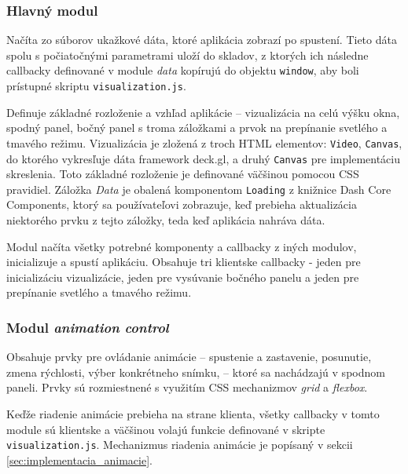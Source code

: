 \subsubsection{Hlavný modul }

Načíta zo súborov ukažkové dáta, ktoré aplikácia zobrazí po spustení. Tieto dáta spolu s počiatočnými parametrami uloží do skladov, z ktorých ich následne callbacky definované v module \emph{data} kopírujú do objektu \texttt{window}, aby boli prístupné skriptu \texttt{visualization.js}.

Definuje základné rozloženie a vzhľad aplikácie -- vizualizácia na celú výšku okna, spodný panel, bočný panel s troma záložkami a prvok na prepínanie svetlého a tmavého režimu. Vizualizácia je zložená z troch HTML elementov: \texttt{Video}, \texttt{Canvas}, do ktorého vykresľuje dáta framework deck.gl, a druhý \texttt{Canvas} pre implementáciu skreslenia. Toto základné rozloženie je definované väčšinou pomocou CSS pravidiel. Záložka \emph{Data} je obalená komponentom \texttt{Loading} z knižnice Dash Core Components, ktorý sa používateľovi zobrazuje, keď prebieha aktualizácia niektorého prvku z tejto záložky, teda keď aplikácia nahráva dáta.

Modul načíta všetky potrebné komponenty a callbacky z iných modulov, inicializuje a spustí aplikáciu. Obsahuje tri klientske callbacky - jeden pre inicializáciu vizualizácie, jeden pre vysúvanie bočného panelu a jeden pre prepínanie svetlého a tmavého režimu.

\subsubsection{Modul \emph{animation control} }

Obsahuje prvky pre ovládanie animácie -- spustenie a zastavenie, posunutie, zmena rýchlosti, výber konkrétneho snímku, -- ktoré sa nachádzajú v spodnom paneli. Prvky sú rozmiestnené s využitím CSS mechanizmov \emph{grid} a \emph{flexbox}.

Keďže riadenie animácie prebieha na strane klienta, všetky callbacky v tomto module sú klientske a väčšinou volajú funkcie definované v skripte \texttt{visualization.js}. Mechanizmus riadenia animácie je popísaný v sekcii \ref{sec:implementacia_animacie}.


